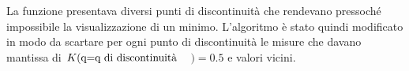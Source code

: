 \documentclass{article}
\begin{document}
    \begin{figure}[H]
    \centering
        \qquad
    \end{figure}
    
    La funzione presentava diversi punti di discontinuità che rendevano pressoché impossibile la visualizzazione di un minimo. L'algoritmo è stato quindi modificato in modo da scartare per ogni punto di discontinuità le misure che davano mantissa di $K(\qq*{q=q di discontinuità}$$)=0.5$ e valori vicini.
    
    \begin{figure}[H]
        \centering
        \qquad
    \end{figure}
\end{document}
